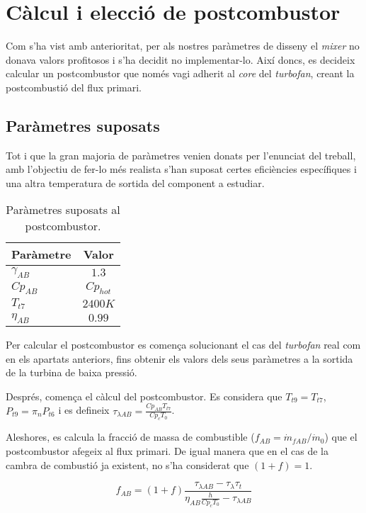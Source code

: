 \section{Càlcul i elecció de postcombustor}
Com s'ha vist amb anterioritat, per als nostres paràmetres de disseny el \textit{mixer} no donava valors profitosos i s'ha decidit no implementar-lo. Així doncs, es decideix calcular un postcombustor que només vagi adherit al \textit{core} del \textit{turbofan}, creant la postcombustió del flux primari.

\subsection{Paràmetres suposats }
Tot i que la gran majoria de paràmetres venien donats per l'enunciat del treball, amb l'objectiu de fer-lo més realista s'han suposat certes eficiències específiques i una altra temperatura de sortida del component a estudiar.

\begin{table}[H]
	\centering
	\begin{tabular}{lc}
		\toprule[3pt]
		\textbf{Paràmetre}&\textbf{Valor}\\
		\midrule[1pt]
		$\gamma_{AB}$ & $1.3$\\
		$ Cp_{AB}$ & $Cp_{hot}$\\
		$T_{t7}$ & $2400K$\\
		$\eta_{AB}$ & $0.99$\\
		
		\bottomrule[2pt]
	\end{tabular}
	\label{ABparam}
	\caption{Paràmetres suposats al postcombustor.}
\end{table}


\noindent Per calcular el postcombustor es comença solucionant el cas del \textit{turbofan} real com en els apartats anteriors, fins obtenir els valors dels seus paràmetres a la sortida de la turbina de baixa pressió.

\noindent Després, comença el càlcul del postcombustor. Es considera que $T_{t9} = T_{t7}$, $P_{t9}=\pi_nP_{t6}$ i es defineix $\tau_{\lambda AB} = \frac{Cp_{AB}T_{t7}}{Cp_cT_0}$.

\noindent Aleshores, es calcula la fracció de massa de combustible ($f_{AB}=\dot{m}_{fAB}/\dot{m}_0$) que el postcombustor afegeix al flux primari. De igual manera que en el cas de la cambra de combustió ja existent, no s'ha considerat que $(1+f)=1$.

\begin{equation}
	f_{AB}=(1+f)\frac{\tau_{\lambda AB}-\tau_{\lambda}\tau_t}{\eta_{AB}\frac{h}{Cp_cT_0}-\tau_{\lambda AB}}
\end{equation}
 
